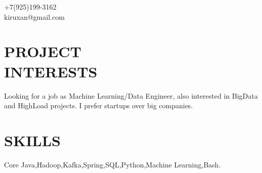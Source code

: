 \documentclass[margin,line]{resume}
\begin{document}
\vspace{50mm}
{
	\sc
    \hfill +7(925)199-3162                  \vspace{0mm}\\\vspace{0mm}%
    \hfill kiruxan@gmail.com            \vspace{0mm}\\\vspace{-10mm}%
\vspace{1mm}
}


\begin{resume}

\vspace{1mm}

    \section{\mysidestyle \textbf{\large{P}\small{ROJECT\\INTERESTS}}}

	Looking for a job as Machine Learning/Data Engineer, also interested in BigData and HighLoad projects. I prefer startups over big companies.


\sectionline

    \section{\mysidestyle \textbf{\large{S}\small{KILLS}}}

    Core Java,\hspace{2mm}Hadoop,\hspace{2mm}Kafka,\hspace{2mm}Spring,\hspace{2mm}SQL,\hspace{2mm}Python,\hspace{2mm}Machine Learning,\hspace{2mm}Bash.


\sectionline


\end{resume}
\end{document}
